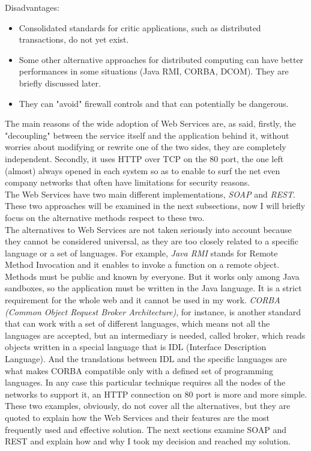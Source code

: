 Disadvantages:

\begin{itemize}

	\item Consolidated standards for critic applications, such as distributed transactions, do not yet exist.
	
	\item Some other alternative approaches for distributed computing can have better performances in some situations (Java RMI, CORBA, DCOM). They are briefly discussed later.
	
	\item They can "avoid" firewall controls and that can potentially be dangerous.
	
\end{itemize}

The main reasons of the wide adoption of Web Services are, as said, firstly, the "decoupling" between the service itself and the application behind it, without worries about modifying or rewrite one of the two sides, they are completely independent. Secondly, it uses HTTP over TCP on the 80 port, the one left (almost) always opened in each system so as to enable to surf the net  even company networks  that often have limitations for security reasons. \\
The Web Services have two main different implementations, \textit{SOAP} and \textit{REST}. These two approaches will be examined in the next subsections, now I will briefly focus on the alternative methods respect to these two. \\
The alternatives to Web Services are not taken seriously into account because they cannot be considered universal, as they are too closely related to a specific language or a set of languages. For example, \textit{Java RMI} stands for Remote Method Invocation and it enables to invoke a function on a remote object. Methods must be public and known by everyone. But it works only among Java sandboxes, so the application must be written in the Java language. It is a strict requirement for the whole web and it cannot be used in my work. \textit{CORBA (Common Object Request Broker Architecture)}, for instance, is another standard that can work with a set of different languages, which means not all the languages are accepted, but an intermediary is needed, called broker, which reads objects written in a special language that is IDL (Interface Description Language). And the translations between IDL and the specific languages are what makes CORBA compatible only with a defined set of programming languages. In any case this particular technique requires all the nodes of the networks to support it, an HTTP connection on 80 port is more and more simple.\\
These two examples, obviously, do not cover all the alternatives, but they are quoted to explain how the Web Services and their features are the most frequently used and effective solution. The next sections examine SOAP and REST and explain how and why I took my decision and reached my solution.\\


